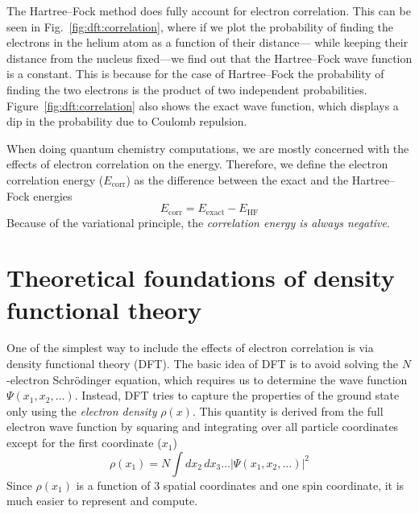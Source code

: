 \documentclass[../Main/chem371-notes.tex]{subfiles}
\begin{document}
The Hartree--Fock method does fully account for electron correlation.
This can be seen in Fig.~\ref{fig:dft:correlation}, where if we plot the probability of finding the electrons in the helium atom as a function of their distance--- while keeping their distance from the nucleus fixed---we find out that the Hartree--Fock wave function is a constant.
This is because for the case of Hartree--Fock the probability of finding the two electrons is the product of two independent probabilities.
Figure~\ref{fig:dft:correlation} also shows the exact wave function, which displays a dip in the probability due to Coulomb repulsion.

When doing quantum chemistry computations, we are mostly concerned with the effects of electron correlation on the energy. Therefore, we define the electron correlation energy ($E_\mathrm{corr}$) as the difference between the exact and the Hartree--Fock energies
\begin{equation}
E_\mathrm{corr} = E_\mathrm{exact} - E_\mathrm{HF}
\end{equation}
Because of the variational principle, the \emph{correlation energy is always negative}.

\section{Theoretical foundations of density functional theory}
One of the simplest way to include the effects of electron correlation is via density functional theory (DFT).
The basic idea of DFT is to avoid solving the $N$-electron Schr\"{o}dinger equation, which requires us to determine the wave function $\Psi(x_1,x_2, \ldots)$.
Instead, DFT tries to capture the properties of the ground state only using the \emph{electron density} $\rho(x)$.
This quantity is derived from the full electron wave function by squaring and integrating over all particle coordinates except for the first coordinate ($x_1$)
\begin{equation}
\rho(x_1) = N \int dx_2 \, dx_3 \ldots |\Psi(x_1,x_2, \ldots)|^2
\end{equation}
Since $\rho(x_1)$ is a function of 3 spatial coordinates and one spin coordinate, it is much easier to represent and compute.

\end{document}
